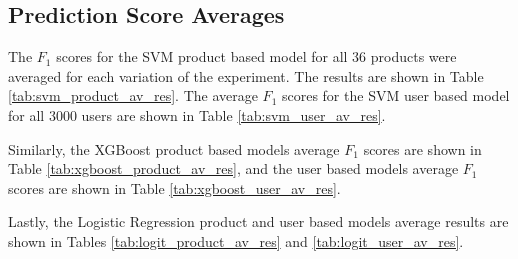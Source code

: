 \documentclass[review]{elsarticle}
\begin{document}
\subsection{Prediction Score Averages}
\label{av_res}

The \(F_{1}\) scores for the SVM product based model for all 36 products were averaged for each variation of the experiment. The results are shown in Table \ref{tab:svm_product_av_res}. The average \(F_{1}\) scores for the SVM user based model for all 3000 users are shown in Table \ref{tab:svm_user_av_res}.

Similarly, the XGBoost product based models average \(F_{1}\) scores are shown in Table \ref{tab:xgboost_product_av_res}, and the user based models average \(F_{1}\) scores are shown in Table \ref{tab:xgboost_user_av_res}.

Lastly, the Logistic Regression product and user based models average results are shown in Tables \ref{tab:logit_product_av_res} and \ref{tab:logit_user_av_res}.

\end{document}
